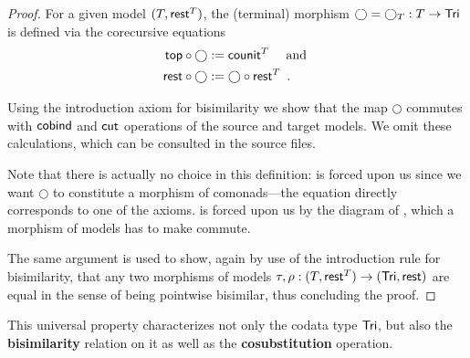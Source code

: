 \documentclass[a4paper,USenglish]{lipics}
\newcommand{\fat}[1]{\textbf{#1}}
\begin{document}
\begin{Long}
\begin{proof}
   For a given model $(T,\mathsf{rest}^T)$, the (terminal) morphism $\bigcirc = \bigcirc_T:T\to\mathsf{Tri}$ is defined via the corecursive equations
%       
    \begin{align}  {\ensuremath{\mathsf{top}}} \circ {\bigcirc} &:= \mathsf{counit}^T \quad \text{ and } \label{eq:terminal_top}\\
                   {\mathsf{rest}} \circ {\bigcirc} &:= {\bigcirc} \circ {\ensuremath{\mathsf{rest}}^T} \enspace . \label{eq:terminal_rest}
    \end{align}

  \noindent
      Using the introduction axiom for bisimilarity we show that the map $\bigcirc$ commutes with $\mathsf{cobind}$ and $\mathsf{cut}$ operations of the source and 
   target models. We omit these calculations, which can be consulted in the \coq source files.
   
   Note that there is actually no choice in this definition:  is forced upon us since we want $\bigcirc$ to constitute 
   a morphism of comonads---the equation directly corresponds to one of the axioms.
    is forced upon us by the diagram of , which a morphism of models has to make commute.
   
   The same argument is used to show, again by use of the introduction rule for bisimilarity, that any two morphisms of models $\tau,\rho : (T,\mathsf{rest}^T) \to (\mathsf{Tri},\mathsf{rest})$
   are equal in the sense of being pointwise bisimilar, thus concluding the proof.   
\end{proof}
\end{Long}

This universal property characterizes not only the codata type $\mathsf{Tri}$, but also
the \fat{bisimilarity} relation on it as well as the \fat{cosubstitution} operation.
\end{document}
